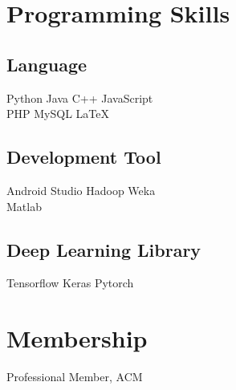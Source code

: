 \documentclass[]{deedy-resume-openfont}
\begin{document}
\begin{minipage}[t]{0.33\textwidth}




\section{Programming Skills}
\subsection{Language}
Python \textbullet{}   Java \textbullet{} C++ \textbullet{} JavaScript \\
PHP \textbullet{} MySQL \textbullet{} \LaTeX\ \\ 
\subsection{Development Tool}
Android Studio \textbullet{} Hadoop \textbullet{} Weka\\ Matlab \\
\subsection{Deep Learning Library}
Tensorflow \textbullet{} Keras \textbullet{} Pytorch
\sectionsep


\section{Membership}
Professional Member, ACM \\
\sectionsep


\end{minipage}
\end{document}
